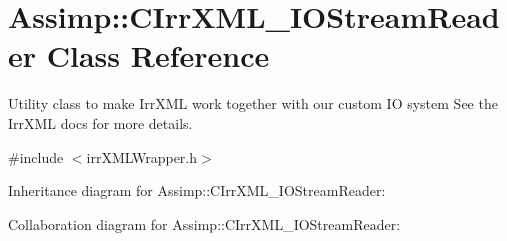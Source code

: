 \hypertarget{class_assimp_1_1_c_irr_x_m_l___i_o_stream_reader}{\section{Assimp\+:\+:C\+Irr\+X\+M\+L\+\_\+\+I\+O\+Stream\+Reader Class Reference}
\label{class_assimp_1_1_c_irr_x_m_l___i_o_stream_reader}
}


Utility class to make Irr\+X\+M\+L work together with our custom I\+O system See the Irr\+X\+M\+L docs for more details.  




{\ttfamily \#include $<$irr\+X\+M\+L\+Wrapper.\+h$>$}



Inheritance diagram for Assimp\+:\+:C\+Irr\+X\+M\+L\+\_\+\+I\+O\+Stream\+Reader\+:


Collaboration diagram for Assimp\+:\+:C\+Irr\+X\+M\+L\+\_\+\+I\+O\+Stream\+Reader\+:
